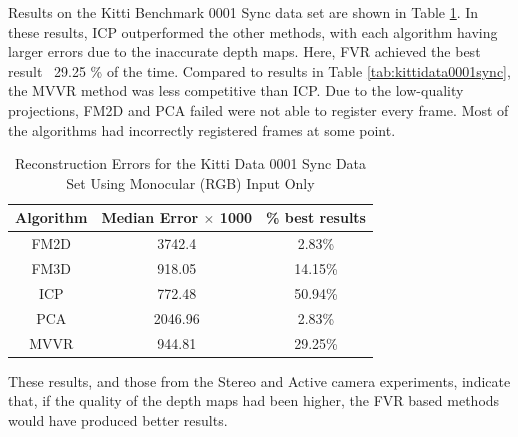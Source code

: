 Results on the Kitti Benchmark 0001 Sync data set are shown in Table \ref{table:MVVRQuantitativeExperimentResults}. In these results, ICP outperformed the other methods, with each algorithm having larger errors due to the inaccurate depth maps. Here, FVR achieved the best result ~29.25 \% of the time. Compared to results in Table \ref{tab:kittidata0001sync}, the MVVR method was less competitive than ICP. Due to the low-quality projections, FM2D and PCA failed were not able to register every frame. Most of the algorithms had incorrectly registered frames at some point.

\begin{table}[t]
\centering
\caption{Reconstruction Errors for the Kitti Data 0001 Sync Data Set Using Monocular (RGB) Input Only}
\begin{tabular}{ccc}
\hline
\textbf{Algorithm} & \textbf{Median Error $\times$ 1000} & \textbf{\% best results}\\ \hline
FM2D	& 3742.4 & 2.83\%\\
FM3D	& 918.05 & 14.15\%\\
ICP	& 772.48 & 50.94\%\\
PCA	& 2046.96 & 2.83\%\\
MVVR	& 944.81 & 29.25\%\\
\end{tabular}
\label{table:MVVRQuantitativeExperimentResults}
\end{table} 

These results, and those from the Stereo and Active camera experiments, indicate that, if the quality of the depth maps had been higher, the FVR based methods would have produced better results. \\

